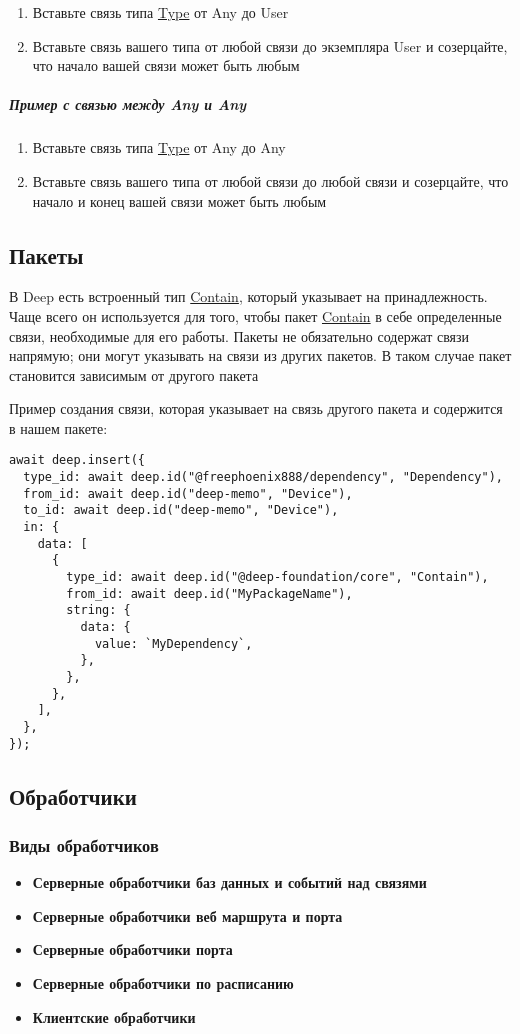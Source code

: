 \documentclass{article}
\begin{document}
\begin{enumerate}
  \item Вставьте связь типа \hyperlink{type.Def}{Type} от Any до User
  \item Вставьте связь вашего типа от любой связи до экземпляра User и
        созерцайте, что начало вашей связи может быть любым
\end{enumerate}
\subparagraph{Пример с связью между Any и Any}
\begin{enumerate}
  \item Вставьте связь типа \hyperlink{type.Def}{Type} от Any до Any
  \item Вставьте связь вашего типа от любой связи до любой связи и
        созерцайте, что начало и конец вашей связи может быть любым
\end{enumerate}
\subsection{Пакеты}

В Deep есть встроенный тип \hyperlink{Contain.Def}{Contain}, который указывает
на
принадлежность. Чаще всего он используется для того, чтобы пакет
\hyperlink{Contain.Def}{Contain} в себе определенные связи, необходимые для его
работы.
Пакеты не обязательно содержат связи напрямую; они могут
указывать на связи из других пакетов. В таком случае пакет
становится зависимым от другого пакета

Пример создания связи, которая указывает на связь другого пакета и содержится в
нашем пакете:

\begin{lstlisting}
await deep.insert({
  type_id: await deep.id("@freephoenix888/dependency", "Dependency"),
  from_id: await deep.id("deep-memo", "Device"),
  to_id: await deep.id("deep-memo", "Device"),
  in: {
    data: [
      {
        type_id: await deep.id("@deep-foundation/core", "Contain"),
        from_id: await deep.id("MyPackageName"),
        string: {
          data: {
            value: `MyDependency`,
          },
        },
      },
    ],
  },
});
\end{lstlisting}

\subsection{Обработчики}

\subsubsection{Виды обработчиков}
\begin{itemize}
  \item \textbf{Серверные обработчики баз данных и событий над связями}
  \item \textbf{Серверные обработчики веб маршрута и порта}
  \item \textbf{Серверные обработчики порта}
  \item \textbf{Серверные обработчики по расписанию}
  \item \textbf{Клиентские обработчики}
\end{itemize}
\end{document}

